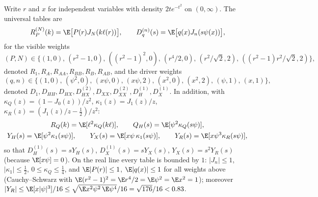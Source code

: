 Write $r$ and $x$ for independent variables with density $2te^{-t^2}$ on $(0,\infty)$. The universal tables are
\[
R^{(N)}_P(k)=\E\bigl[P(r)J_N(k\ell(r))\bigr],\qquad D^{(n)}_q(s)=\E\bigl[q(x)J_n(s\psi(x))\bigr],
\]
for the visible weights
\[
(P,N)\in\{(1,0),\,(r^2-1,0),\,((r^2-1)^2,0),\,(r^4/2,0),\,(r^2/\sqrt2,2),\,((r^2-1)r^2/\sqrt2,2)\},
\]
denoted $R_1,R_A,R_{AA},R_{BB},R_B,R_{AB}$, and the driver weights
\[
(q,n)\in\{(1,0),\,(\psi^2,0),\,(x\psi,0),\,(x\psi,2),\,(x^2,0),\,(x^2,2),\,(\psi,1),\,(x,1)\},
\]
denoted $D_1,D_{HH},D_{HX},D^{(2)}_{HX},D_{XX},D^{(2)}_{XX},D^{(1)}_H,D^{(1)}_X$.
In addition, with $\kappa_Q(z)=(1-J_0(z))/z^2$, $\kappa_1(z)=J_1(z)/z$, $\kappa_R(z)=(J_1(z)/z-\tfrac12)/z^2$:
\begin{gather*}
R_Q(k)=\E[\ell^2\kappa_Q(k\ell)],\qquad Q_H(s)=\E[\psi^2\kappa_Q(s\psi)],\\
Y_H(s)=\E[\psi^2\kappa_1(s\psi)],\qquad Y_X(s)=\E[x\psi\,\kappa_1(s\psi)],\qquad Y_R(s)=\E[x\psi^3\kappa_R(s\psi)],
\end{gather*}
so that $D^{(1)}_H(s)=sY_H(s)$, $D^{(1)}_X(s)=sY_X(s)$, $Y_X(s)=s^2Y_R(s)$ (because $\E[x\psi]=0$). On the real line every table is bounded by $1$:
$|J_n|\le1$, $|\kappa_1|\le\frac12$, $0\le\kappa_Q\le\frac14$, and $\E|P(r)|\le1$, $\E|q(x)|\le1$ for all weights above (Cauchy--Schwarz with
$\E(r^2-1)^2=\E r^4/2=\E\psi^2=\E x^2=1$); moreover $|Y_R|\le\E[x|\psi|^3]/16\le\sqrt{\E x^2\psi^2\,\E\psi^4}/16=\sqrt{176}/16<0.83$.

